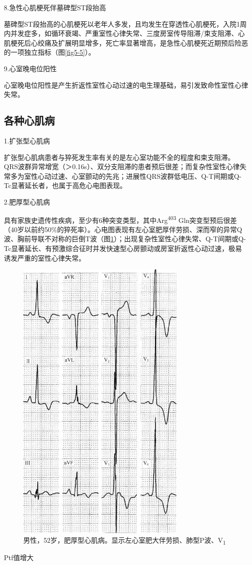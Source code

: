 8.急性心肌梗死伴墓碑型ST段抬高

墓碑型ST段抬高的心肌梗死以老年人多发，且均发生在穿透性心肌梗死，入院1周内并发症多，如循环衰竭、严重室性心律失常、三度房室传导阻滞/束支阻滞、心肌梗死后心绞痛及扩展明显增多，死亡率显著增高，是急性心肌梗死近期预后险恶的一项独立指标（图\ref{fig5-5}）。

9.心室晚电位阳性

心室晚电位阳性是产生折返性室性心动过速的电生理基础，易引发致命性室性心律失常。

\protect\hypertarget{text00041.htmlux5cux23subid450}{}{}

\subsection{各种心肌病}

1.扩张型心肌病

扩张型心肌病患者与猝死发生率有关的是左心室功能不全的程度和束支阻滞。QRS波群异常增宽（＞0.16s）、双分支阻滞的患者预后很差；而复杂性室性心律失常多为室性心动过速、心室颤动的先兆；进展性QRS波群低电压、Q-T间期或Q-Tc显著延长者，也属于高危心电图表现。

2.肥厚型心肌病

具有家族史遗传性疾病，至少有6种突变类型，其中Arg\textsuperscript{403}
Gln突变型预后很差（40岁以前约50\%的猝死率）。心电图表现有左心室肥厚伴劳损、深而窄的异常Q波、胸前导联不对称的巨倒T波（图\ref{fig34-8}）；出现复杂性室性心律失常、Q-T间期或Q-Tc显著延长、有预激综合征时并发快速型心房颤动或房室折返性心动过速，极易诱发严重的室性心律失常。

\begin{figure}[!htbp]
 \centering
 \includegraphics[width=3.29167in,height=5.66667in]{./images/Image00548.jpg}
 \captionsetup{justification=centering}
 \caption{男性，52岁，肥厚型心肌病。显示左心室肥大伴劳损、肺型P波、V\textsubscript{1}}
 \label{fig34-8}
  \end{figure} 
Ptf值增大

